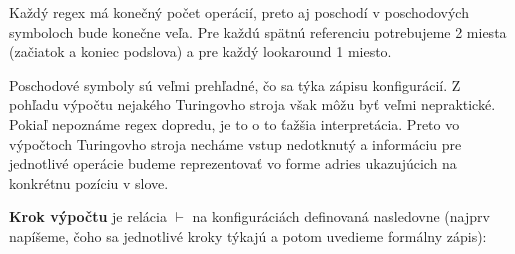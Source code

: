 Každý regex má konečný počet operácií, preto aj poschodí v poschodových symboloch bude konečne veľa. Pre každú spätnú referenciu potrebujeme 2 miesta (začiatok a koniec podslova) a pre každý lookaround 1 miesto.

Poschodové symboly sú veľmi prehľadné, čo sa týka zápisu konfigurácií. Z pohľadu výpočtu nejakého Turingovho stroja však môžu byť veľmi nepraktické. Pokiaľ nepoznáme regex dopredu, je to o to ťažšia interpretácia. Preto vo výpočtoch Turingovho stroja necháme vstup nedotknutý a informáciu pre jednotlivé operácie budeme reprezentovať vo forme adries ukazujúcich na konkrétnu pozíciu v slove.

\begin{df}
\textbf{Krok výpočtu} je relácia $\vdash$ na konfiguráciách definovaná nasledovne (najprv napíšeme, čoho sa jednotlivé kroky týkajú a potom uvedieme formálny zápis):


\end{df}
